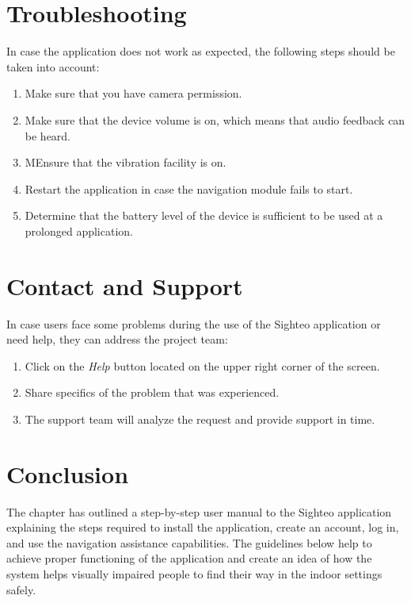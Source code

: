 \documentclass{FastFyp}
\begin{document}
\section{Troubleshooting}

In case the application does not work as expected, the following steps should be taken into account:

\begin{enumerate}
\item Make sure that you have camera permission.
\item Make sure that the device volume is on, which means that audio feedback can be heard.
\item MEnsure that the vibration facility is on.
\item Restart the application in case the navigation module fails to start.
\item Determine that the battery level of the device is sufficient to be used at a prolonged application.
\end{enumerate}

\section{Contact and Support}

In case users face some problems during the use of the Sighteo application or need help, they can address the project team:

\begin{enumerate}
\item Click on the \textit{Help} button located on the upper right corner of the screen.
\item Share specifics of the problem that was experienced.
\item The support team will analyze the request and provide support in time.
\end{enumerate}

\section{Conclusion}

The chapter has outlined a step-by-step user manual to the Sighteo application explaining the steps required to install the application, create an account, log in, and use the navigation assistance capabilities. The guidelines below help to achieve proper functioning of the application and create an idea of how the system helps visually impaired people to find their way in the indoor settings safely.
\end{document}
